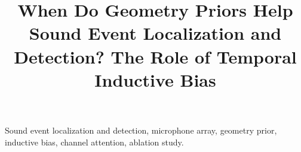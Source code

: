 \documentclass[journal]{IEEEtran}
\begin{document}
\title{When Do Geometry Priors Help Sound Event Localization and Detection? The Role of Temporal Inductive Bias}

\author{
}

\maketitle

\begin{abstract}

\end{abstract}

\begin{IEEEkeywords}
Sound event localization and detection, microphone array, geometry prior, inductive bias, channel attention, ablation study.
\end{IEEEkeywords}












\end{document}
